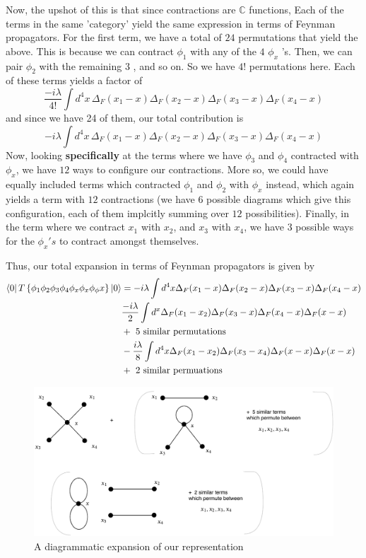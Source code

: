 Now, the upshot of this is that since contractions are $ \mathbb{ C} $ functions, 
Each of the terms in the same 'category' yield the same expression in 
terms of Feynman propagators. For the first term, we have a total 
of $ 24 $  permutations that yield the above. This is because we can 
contract $ \phi _ 1 $ with any of the $4  $ $ \phi _x $ 's. Then, we can 
pair $ \phi_ 2 $ with the remaining $ 3 $ , and so on. So we have $ 4 ! $ permutations here.
Each of these terms yields a factor of 
\[
\frac{ - i \lambda }{ 4!} \int d ^ 4 x \, \Delta_ F ( x_1 - x ) \Delta_ F( x_2  - x) \Delta_ F ( x_3 - x ) 
\Delta _ F( x_4 - x ) 
\] and since we have 24 of them, our total contribution is 
\[
- i \lambda \int d ^ 4 x \, \Delta _ F ( x_1 - x ) \Delta_ F ( x_2 - x ) \Delta _ F( x_3 - x ) 
\Delta _ F ( x_4 - x) 
\] Now, looking \textbf{specifically} at the terms where we have 
$ \phi _ 3 $ and $ \phi _ 4 $ contracted with $ \phi _ x $, 
we have $ 12 $ ways to configure our contractions. More so, we
could have equally included terms which contracted 
$ \phi _ 1 $ and $ \phi _ 2 $ with $ \phi  _ x $ instead, which again 
yields a term with $ 12 $ contractions (we have 6 possible
diagrams which give this configuration, each of them 
implcitly summing over $12 $ possibilities). 
Finally, in the term where we contract $ x_ 1 $ with $ x_ 2 $, 
and $ x_3 $ with $ x_ 4 $, we have 3 possible ways for 
the  $ \phi _ x 's $ to contract amongst themselves. 

Thus, our total expansion in terms of Feynman propagators 
is given by 
\begin{align*}
	 \bra{ 0 } T \left\{  \phi _ 1 \phi _ 2 \phi _ 3 \phi _ 4 \phi _ x 
	 \phi _ x \phi _ \phi x \right\}  \ket{ 0 }  &=   - i \lambda \int d ^ 4 x \Delta _ F ( x_ 1- x ) 
	 \Delta _ F ( x_ 2 - x ) \Delta _ F ( x_ 3 - x ) \Delta _F ( x_4 - x ) \\
	  &  \frac{ -i  \lambda }{ 2 } \int d ^ x \Delta _ F ( x_1 - x_2 ) 
	 \Delta _ F ( x_3  - x ) \Delta _ F ( x_4 - x ) \Delta _ F ( x- x) \\
	  &  + \text{ 5 similar permutations } \\
	  & - \frac{ i \lambda }{ 8 } \int d ^ 4 x \Delta _ F ( x_1 - x_2) \Delta _ F ( x_3 - x_4) 
	  \Delta_ F ( x - x) \Delta _ F ( x - x ) \\
	  & + \text{ 2 similar permuations}
\end{align*}

\begin{figure}[h]
	\centering
	\includegraphics[width=0.8\linewidth]{figures/phifour.pdf}
	\caption{A diagrammatic expansion of 
	our representation}%
	\label{fig:}
\end{figure} 

